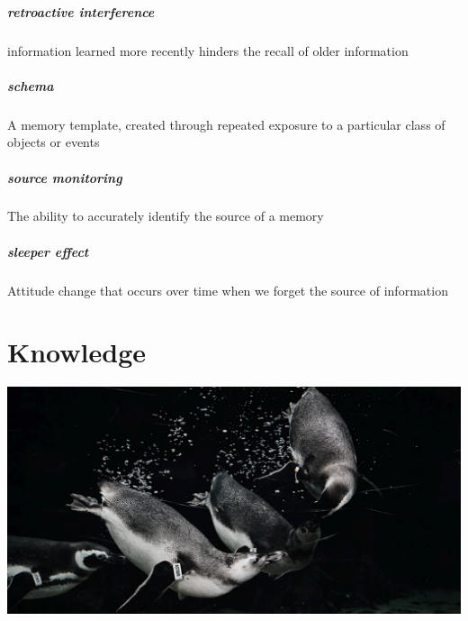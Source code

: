 \documentclass[
]{krantz}
\begin{document}
\hypertarget{retroactive-interference}{%
\paragraph*{retroactive interference}\label{retroactive-interference}}

information learned more recently hinders the recall of older information

\hypertarget{schema}{%
\paragraph*{schema}\label{schema}}

A memory template, created through repeated exposure to a particular class of objects or events

\hypertarget{source-monitoring-1}{%
\paragraph*{source monitoring}\label{source-monitoring-1}}

The ability to accurately identify the source of a memory

\hypertarget{sleeper-effect}{%
\paragraph*{sleeper effect}\label{sleeper-effect}}

Attitude change that occurs over time when we forget the source of information

\hypertarget{knowledge}{%
\chapter{Knowledge}\label{knowledge}}

\begin{center}\includegraphics[width=1\linewidth]{images/ch7/cover-penguins} \end{center}
\end{document}
